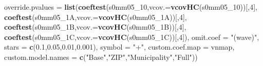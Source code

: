 \documentclass[
]{article}
\newenvironment{Shaded}{\begin{snugshade}}{\end{snugshade}}
\newcommand{\DataTypeTok}[1]{\textcolor[rgb]{0.13,0.29,0.53}{#1}}
\newcommand{\DecValTok}[1]{\textcolor[rgb]{0.00,0.00,0.81}{#1}}
\newcommand{\FloatTok}[1]{\textcolor[rgb]{0.00,0.00,0.81}{#1}}
\newcommand{\KeywordTok}[1]{\textcolor[rgb]{0.13,0.29,0.53}{\textbf{#1}}}
\newcommand{\NormalTok}[1]{#1}
\newcommand{\StringTok}[1]{\textcolor[rgb]{0.31,0.60,0.02}{#1}}
\begin{document}
\begin{Shaded}
\begin{Highlighting}[]
          \DataTypeTok{override.pvalues =} \KeywordTok{list}\NormalTok{(}\KeywordTok{coeftest}\NormalTok{(s0mm05_}\DecValTok{10}\NormalTok{,}\DataTypeTok{vcov.=}\KeywordTok{vcovHC}\NormalTok{(s0mm05_}\DecValTok{10}\NormalTok{))[,}\DecValTok{4}\NormalTok{],}
                                  \KeywordTok{coeftest}\NormalTok{(s0mm05_1A,}\DataTypeTok{vcov.=}\KeywordTok{vcovHC}\NormalTok{(s0mm05_1A))[,}\DecValTok{4}\NormalTok{],}
                                  \KeywordTok{coeftest}\NormalTok{(s0mm05_1B,}\DataTypeTok{vcov.=}\KeywordTok{vcovHC}\NormalTok{(s0mm05_1B))[,}\DecValTok{4}\NormalTok{],}
                                  \KeywordTok{coeftest}\NormalTok{(s0mm05_1C,}\DataTypeTok{vcov.=}\KeywordTok{vcovHC}\NormalTok{(s0mm05_1C))[,}\DecValTok{4}\NormalTok{]),}
          \DataTypeTok{omit.coef =} \StringTok{"(wave)"}\NormalTok{, }\DataTypeTok{stars =} \KeywordTok{c}\NormalTok{(}\FloatTok{0.1}\NormalTok{,}\FloatTok{0.05}\NormalTok{,}\FloatTok{0.01}\NormalTok{,}\FloatTok{0.001}\NormalTok{), }\DataTypeTok{symbol =} \StringTok{"+"}\NormalTok{,}
          \DataTypeTok{custom.coef.map =}\NormalTok{ vnmap, }
          \DataTypeTok{custom.model.names =} \KeywordTok{c}\NormalTok{(}\StringTok{"Base"}\NormalTok{,}\StringTok{"ZIP"}\NormalTok{,}\StringTok{"Municipality"}\NormalTok{,}\StringTok{"Full"}\NormalTok{))}
\end{Highlighting}
\end{Shaded}
\end{document}
